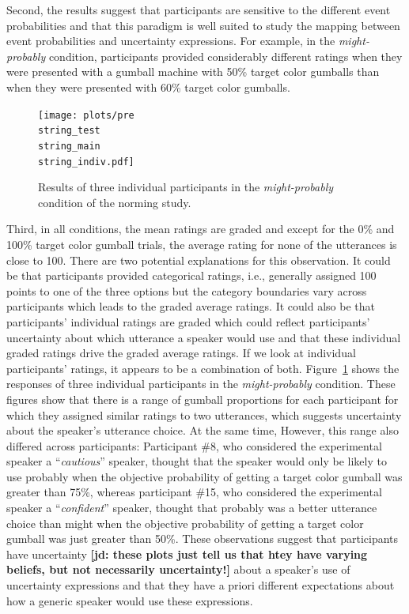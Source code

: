 \documentclass[lucida,biblatex]{sp} %
\newcommand{\jd}[1]{\textcolor{PinkyPurple}{\textbf{[jd: #1]}}}
\begin{document}
Second, the results suggest that participants are sensitive to the different event probabilities and that this paradigm is well suited to study 
the mapping between event probabilities and uncertainty expressions. For example, in the \textit{might-probably} condition, participants
provided considerably different ratings when they were presented with a gumball machine with 50\% target color gumballs than when they
were presented with 60\% target color gumballs.

\begin{figure}
\texttt{[image: plots/pre\\string\_test\\string\_main\\string\_indiv.pdf]}
\caption{Results of three individual participants in the \emph{might-probably} condition of the norming study. \label{fig:norming-results-indiv}}
\end{figure}


Third, in all conditions, the mean ratings are graded and except for the 0\% and 100\% target color gumball trials, the average rating for none of the
utterances is close to 100. There are two potential explanations for this observation. It could be that participants provided categorical ratings, i.e.,
generally assigned 100 points to one of the three options but the category boundaries vary across participants which leads to the graded average ratings.
It could also be that participants' individual ratings are graded which could reflect participants' uncertainty about which utterance a speaker would use 
and that these individual graded ratings drive the  graded average ratings. If we look at individual participants' ratings, it appears to be a combination of both.
Figure~\ref{fig:norming-results-indiv} shows the responses of three individual participants in the \emph{might-probably} condition. These figures show that there 
is a range of gumball proportions for each participant for which they assigned similar ratings to two utterances, which suggests uncertainty about the speaker's 
utterance choice. At the same time, However, this range also differed across participants: Participant \#8, who considered the experimental speaker a ``\textit{cautious}'' speaker, thought that the speaker would only be likely to use {\sc probably} 
when the objective probability of getting a target color gumball was greater than 75\%, whereas participant \#15, who considered the experimental speaker a ``\textit{confident}'' speaker, thought that  {\sc probably} was a better utterance choice than {\sc might} 
when the objective probability of getting a target color gumball was just greater than 50\%. These observations suggest that participants have uncertainty \jd{these plots just tell us that htey have varying beliefs, but not necessarily uncertainty!} about a 
speaker's use of uncertainty expressions and that they have a priori different expectations about how a generic speaker would use these expressions.
\end{document}

